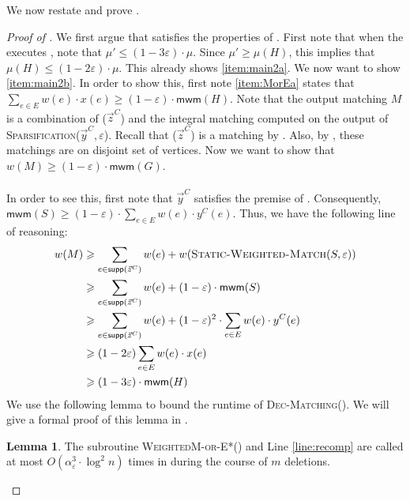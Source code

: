 \documentclass[a4paper,11pt]{article}
\newcommand{\eps}{\varepsilon}
\theoremstyle{definition}
\theoremstyle{definition}
\theoremstyle{definition}
\theoremstyle{definition}
\theoremstyle{definition}
\newtheorem{lemma2}[definition2]{Lemma}
\theoremstyle{definition}
\theoremstyle{definition}
\theoremstyle{definition}
\theoremstyle{definition}
\theoremstyle{definition}
\theoremstyle{definition}
\theoremstyle{definition}
\theoremstyle{definition}
\theoremstyle{definition}
\theoremstyle{definition}
\begin{document}
We now restate and prove .

\decmatching*

\begin{proof}[Proof of ]
We first argue that  satisfies the properties of . First note that when the  executes , note that $\mu'\leqslant (1-3\eps)\cdot \mu$. Since $\mu'\geqslant \mu(H)$, this implies that $\mu(H)\leqslant (1-2\eps)\cdot \mu$. This already shows \ref{item:main2a}. We now want to show \ref{item:main2b}. In order to show this, first note \ref{item:MorEa} states that $\sum_{e\in E}w(e)\cdot x(e)\geqslant (1-\varepsilon)\cdot \textsf{mwm}(H)$. Note that the output matching $M$ is a combination of ($\vec{z}^C$) and the integral matching computed on the output of \textsc{Sparsification}($\vec{y}^C, \eps$). Recall that ($\vec{z}^C$) is a matching by . Also, by , these matchings are on disjoint set of vertices. Now we want to show that $w(M)\geqslant (1-\varepsilon)\cdot\textsf{mwm}(G)$. \\ \\
In order to see this, first note that $\vec{y}^C$ satisfies the premise of . Consequently, $\textsf{mwm}(S)\geqslant (1-\eps)\cdot \sum_{e\in E}w(e)\cdot y^C(e)$. Thus, we have the following line of reasoning:
\begin{align*}
w(M)&\geqslant \sum_{e\in \textsf{supp}(\vec{z}^C)}w(e)+w(\textsc{Static-Weighted-Match}(S,\eps))\\
&\geqslant \sum_{e\in \textsf{supp}(\vec{z}^C)}w(e)+(1-\eps)\cdot \textsf{mwm}(S)\\
&\geqslant \sum_{e\in \textsf{supp}(\vec{z}^C)} w(e)+(1-\eps)^2\cdot \sum_{e\in E}w(e)\cdot y^C(e)\\
&\geqslant (1-2\eps) \sum_{e\in E} w(e)\cdot x(e)\\
&\geqslant (1-3\eps)\cdot \textsf{mwm}(H)
\end{align*}
We use the following lemma to bound the runtime of \textsc{Dec-Matching}(). We will give a formal proof of this lemma in .
\begin{lemma2}\label{lem:callstoMorE}
The subroutine \textsc{WeightedM-or-E*}() and Line \ref{line:recomp} are called at most $O(\alpha_{\eps}^3\cdot \log^2n)$ times in  during the course of $m$ deletions. 
\end{lemma2}

\end{proof}
\end{document}

